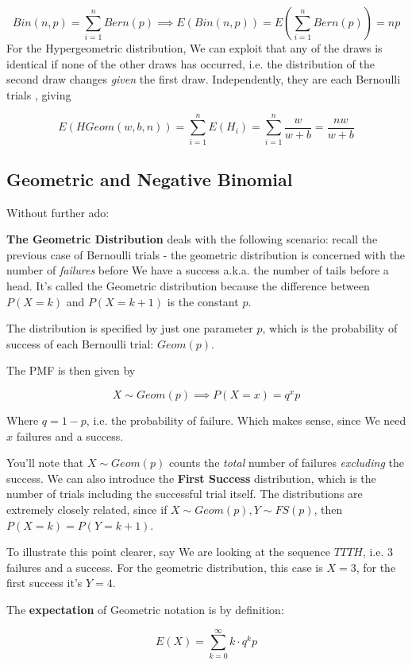 \documentclass{article}
\begin{document}
		$$Bin(n, p) = \sum^n_{i=1} Bern(p) \implies E(Bin(n, p)) = E\left( \sum^n_{i=1} Bern(p) \right) = np$$
		For the Hypergeometric distribution, We can exploit that any of the draws is identical if none of the other draws has occurred, i.e. the distribution of the second draw changes \textit{given} the first draw. Independently, they are each Bernoulli trials , giving
		
		$$E(HGeom(w, b, n)) = \sum^n_{i=1} E(H_i) = \sum^n_{i=1} \frac{w}{w+b} = \frac{nw}{w+b}$$
		
		
	\subsection{Geometric and Negative Binomial}
	
		Without further ado:
		
		\textbf{The Geometric Distribution} deals with the following scenario: recall the previous case of Bernoulli trials - the geometric distribution is concerned with the number of \textit{failures} before We have a success a.k.a. the number of tails before a head. It's called the Geometric distribution because the difference between $P(X=k)$ and $P(X=k+1)$ is the constant $p$.
		
		The distribution is specified by just one parameter $p$, which is the probability of success of each Bernoulli trial: $Geom(p)$.
		
		The PMF is then given by 
		
		$$X \sim Geom(p) \implies P(X = x) = q^xp$$
		
		Where $q = 1-p$, i.e. the probability of failure. Which makes sense, since We need $x$ failures and a success.
		
		You'll note that $X \sim Geom(p)$ counts the \textit{total} number of failures \textit{excluding} the success. We can also introduce the \textbf{First Success} distribution, which is the number of trials including the successful trial itself. The distributions are extremely closely related, since if $X \sim Geom(p), Y \sim FS(p)$, then $P(X = k) = P(Y = k+1)$. 
		
		To illustrate this point clearer, say We are looking at the sequence $TTTH$, i.e. 3 failures and a success. For the geometric distribution, this case is $X = 3$, for the first success it's $Y = 4$.
		
		The \textbf{expectation} of Geometric notation is by definition:
		
		$$E(X) = \sum^\infty_{k = 0} k\cdot q^kp$$
		
\end{document}
